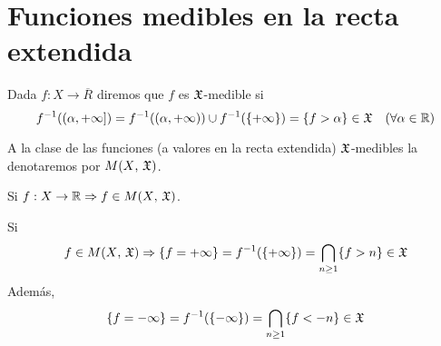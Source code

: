 \section{Funciones medibles en la recta extendida}

\begin{definition}
    Dada $f: X \to \overline{R}$ diremos que $f$ es $\mathfrak{X}$-medible si
    \begin{equation*}
        f^{-1}((\alpha, +\infty]) = f^{-1}((\alpha, +\infty)) \cup f^{-1}(\{ +\infty \}) = \{ f > \alpha \} \in \mathfrak{X} \quad (\forall \alpha \in \mathbb{R})
    \end{equation*}
\end{definition}

A la clase de las funciones (a valores en la recta extendida) $\mathfrak{X}$-medibles la denotaremos por $M(X \text{, } \mathfrak{X})$.

\begin{note}
    Si $f: X \to \mathbb{R} \Rightarrow f \in M(X \text{, } \mathfrak{X})$.
\end{note}

\begin{note}
    Si \begin{equation*}f \in M(X\text{, } \mathfrak{X}) \Rightarrow \{ f = +\infty \} = f^{-1}(\{ +\infty \}) = \bigcap_{n \geq 1} \{ f > n \} \in \mathfrak{X}\end{equation*}
    Además, \begin{equation*}\{ f = -\infty \} = f^{-1}(\{ -\infty \}) = \bigcap_{n \geq 1} \{ f < -n \} \in \mathfrak{X}\end{equation*}
\end{note}

